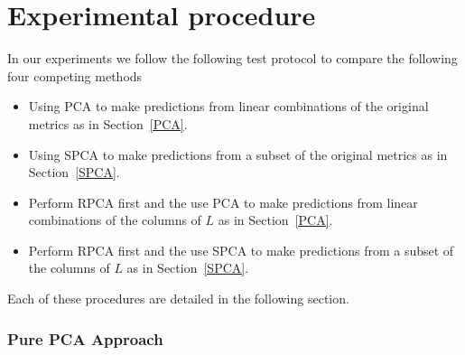 \documentclass[conference]{IEEEtran}
\begin{document}



\section{Experimental procedure}
In our experiments we follow the following test protocol to compare the following four competing methods
\begin{itemize}
    \item Using PCA to make predictions from linear combinations of the original metrics as in Section~\ref{PCA}.
    \item Using SPCA to make predictions from a subset of the original metrics as in Section~\ref{SPCA}.
    \item Perform RPCA first and the use PCA to make predictions from linear combinations of the columns of $L$ as in Section~\ref{PCA}.
    \item Perform RPCA first and the use SPCA to make predictions from a subset of the columns of $L$ as in Section~\ref{SPCA}.
\end{itemize}

Each of these procedures are detailed in the following section.


\subsubsection{Pure PCA Approach}

\end{document}

